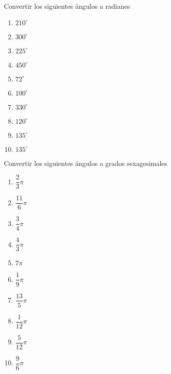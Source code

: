 \begin{figure*}[hb!]
	\begin{kaoexercises}
		Convertir los siguientes ángulos a radianes
		\begin{multicols*}{4}
			\begin{enumerate}
				\setlength\itemsep{4mm}
				\item $210^\circ$
				\item $300^\circ$
				\item $225^\circ$
				\item $450^\circ$
				\item $72^\circ$
				\item $100^\circ$
				\item $330^\circ$
				\item $120^\circ$
				\item $135^\circ$
				\item $135^\circ$
			\end{enumerate}
		\end{multicols*}
		Convertir los siguientes ángulos a grados sexagesimales
		\begin{multicols*}{4}
			\begin{enumerate}
				\setlength\itemsep{4mm}
				\item $\dfrac{2}{3}\pi$
				\item $\dfrac{11}{6}\pi$
				\item $\dfrac{3}{4}\pi$
				\item $\dfrac{4}{3}\pi$
				\item $7 \pi$
				\item $\dfrac{1}{9} \pi$
				\item $\dfrac{13}{5} \pi$
				\item $\dfrac{1}{12} \pi$
				\item $\dfrac{5}{12} \pi$
				\item $\dfrac{9}{6} \pi$
			\end{enumerate}
		\end{multicols*}		
	\end{kaoexercises}
\end{figure*}

